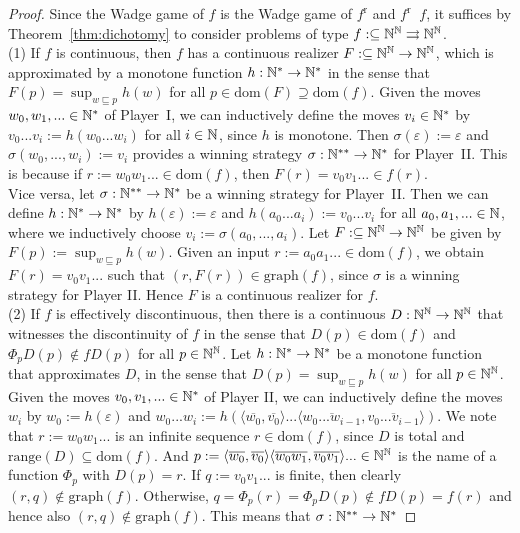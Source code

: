 \documentclass[10pt,a4paper]{amsart}
\def\IN{{\Bbb{N}}}
\def\In{\subseteq}
\def\dom{{\mathrm{dom}}}
\def\equivSW{\mathop{\equiv_{\mathrm{sW}}}}
\def\graph{{\mathrm{graph}}}
\def\mto{\rightrightarrows}
\def\prefix{\sqsubseteq}
\def\r{\mathrm{r}}
\def\range{{\mathrm{range}}}
\begin{document}
\begin{proof}
Since the Wadge game of $f$ is the Wadge game of $f^\r$ and $f^\r\equivSW f$, it suffices by 
Theorem~\ref{thm:dichotomy} to consider problems of type $f:\In\IN^\IN\mto\IN^\IN$.\smallskip\\
(1) If $f$ is continuous, then $f$ has a continuous realizer $F:\In\IN^\IN\to\IN^\IN$, which is approximated
by a monotone function $h:\IN^*\to\IN^*$ in the sense that $F(p)=\sup_{w\prefix p}h(w)$ for all $p\in\dom(F)\supseteq\dom(f)$. Given the moves $w_0,w_1,...\in\IN^*$ of Player~I, we can
inductively define the moves $v_i\in\IN^*$ by $v_0...v_i:=h(w_0...w_i)$ for all $i\in\IN$, since $h$ is monotone.
Then $\sigma(\varepsilon):=\varepsilon$ and $\sigma(w_0,...,w_i):=v_i$ provides a winning strategy
$\sigma:\IN^{**}\to\IN^*$ for Player~II.
This is because if $r:=w_0w_1...\in\dom(f)$, then $F(r)=v_0v_1...\in f(r)$.\smallskip\\
Vice versa, let $\sigma:\IN^{**}\to\IN^*$ be a winning strategy for Player~II.
Then we can define $h:\IN^*\to\IN^*$ by $h(\varepsilon):=\varepsilon$ and $h(a_0...a_i):=v_0...v_i$ for all $a_0,a_1,...\in\IN$,
where we inductively choose  $v_i:=\sigma(a_0,...,a_i)$.
Let $F:\In\IN^\IN\to\IN^\IN$ be given by $F(p):=\sup_{w\prefix p}h(w)$.
Given an input $r:=a_0a_1...\in\dom(f)$, we obtain $F(r)=v_0v_1...$ such that
$(r,F(r))\in\graph(f)$, since $\sigma$ is a winning strategy for Player II. 
Hence $F$ is a continuous realizer for $f$.\medskip\\
(2) If $f$ is effectively discontinuous, then there is a continuous $D:\IN^\IN\to\IN^\IN$
that witnesses the discontinuity of $f$ in the sense that $D(p)\in\dom(f)$ and
$\Phi_pD(p)\not\in fD(p)$ for all $p\in\IN^\IN$.
Let $h:\IN^*\to\IN^*$ be a monotone function that approximates $D$, in the sense
that $D(p)=\sup_{w\prefix p}h(w)$ for all $p\in\IN^\IN$.
Given the moves $v_0,v_1,...\in\IN^*$ of Player II, we can inductively
define the moves $w_i$ by $w_0:=h(\varepsilon)$ and  $w_0...w_i:=h(\langle\overline{w_0},\overline{v_0}\rangle...\langle\overline{w_0...w_{i-1}},\overline{v_0...v_{i-1}}\rangle)$. 
We note that $r:=w_0w_1...$ is an infinite sequence $r\in\dom(f)$,
since $D$ is total and $\range(D)\In\dom(f)$. And $p:=\langle\overline{w_0},\overline{v_0}\rangle\langle\overline{w_0w_{1}},\overline{v_0v_{1}}\rangle...\in\IN^\IN$
is the name of a function $\Phi_p$ with $D(p)=r$. 
If $q:=v_0v_1...$ is finite, then clearly $(r,q)\not\in\graph(f)$. Otherwise, $q=\Phi_p(r)=\Phi_pD(p)\not\in fD(p)=f(r)$
and hence also $(r,q)\not\in\graph(f)$. This means that $\sigma:\IN^{**}\to\IN^*$

\end{proof}
\end{document}
